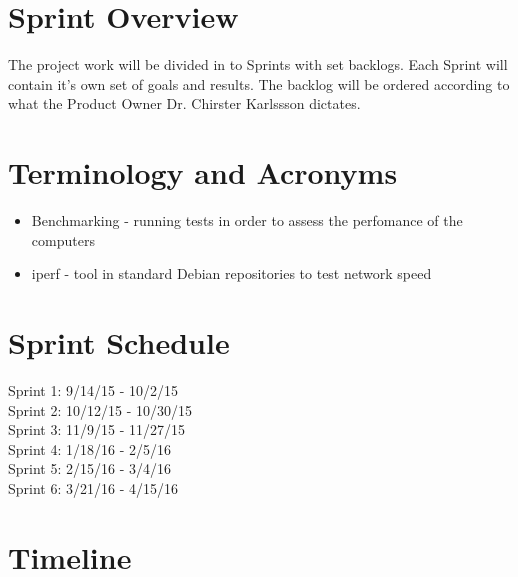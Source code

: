 \section{Sprint  Overview}


The project work will be divided in to Sprints with set backlogs. Each Sprint will contain it's own set of goals and results. The backlog will be ordered according to what the Product Owner Dr. Chirster Karlssson dictates. 

\section{Terminology and Acronyms}
\begin{itemize}
	\item Benchmarking - running tests in order to assess the perfomance of the computers
	\item iperf - tool in standard Debian repositories to test network speed
\end{itemize}

\section{Sprint Schedule}

Sprint 1: 9/14/15 - 10/2/15 \\
Sprint 2: 10/12/15 - 10/30/15 \\
Sprint 3: 11/9/15 - 11/27/15 \\
Sprint 4: 1/18/16 - 2/5/16 \\
Sprint 5: 2/15/16 - 3/4/16 \\
Sprint 6: 3/21/16 - 4/15/16 \\

\section{Timeline}



